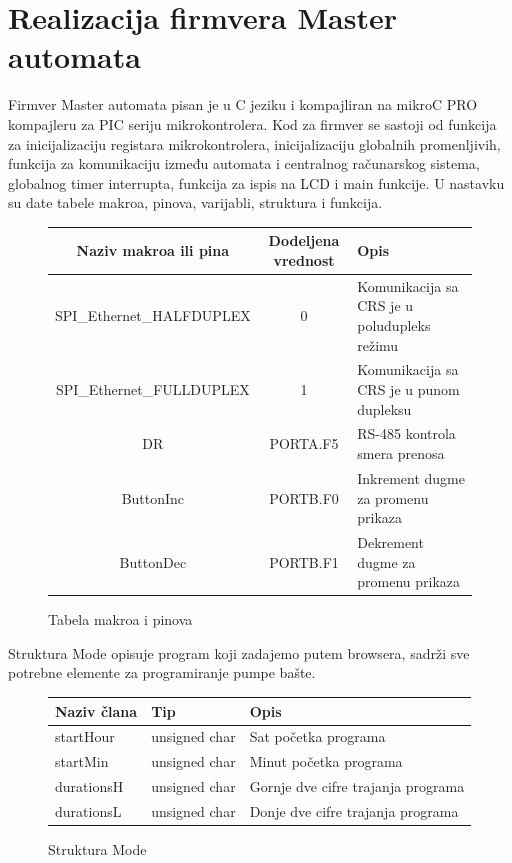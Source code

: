 \documentclass[12pt]{article}
\numberwithin{figure}{section}
\begin{document}
\section{Realizacija firmvera Master automata}
  Firmver Master automata pisan je u C jeziku i kompajliran na mikroC PRO kompajleru za PIC seriju mikrokontrolera.
  Kod za firmver se sastoji od funkcija za inicijalizaciju registara mikrokontrolera, inicijalizaciju globalnih promenljivih, funkcija za komunikaciju između automata i centralnog računarskog sistema, globalnog timer interrupta, funkcija za ispis na LCD i main funkcije.\newline
  U nastavku su date tabele makroa, pinova, varijabli, struktura i funkcija.
  \begin{figure}[ht]
    \caption{Tabela makroa i pinova}
    \begin{tabular}{|c|c|p{5.5cm}|}
      \hline
      Naziv makroa ili pina & Dodeljena vrednost & Opis \\
      \hline
      SPI\_Ethernet\_HALFDUPLEX & 0 & Komunikacija sa CRS je u poludupleks režimu\\
      \hline
      SPI\_Ethernet\_FULLDUPLEX & 1 & Komunikacija sa CRS je u punom dupleksu\\
      \hline
      DR & PORTA.F5 & RS-485 kontrola smera prenosa\\
      \hline
      ButtonInc & PORTB.F0 & Inkrement dugme za promenu prikaza\\
      \hline
      ButtonDec & PORTB.F1 &  Dekrement dugme za promenu prikaza\\
      \hline
    \end{tabular}
\end{figure}
\newline
Struktura Mode opisuje program koji zadajemo putem browsera, sadrži sve potrebne elemente za programiranje pumpe bašte.

\begin{figure}[ht]
  \caption{Struktura Mode}
  \begin{tabular}{|p{5cm}|p{5cm}|p{5cm}|}
    \hline
    Naziv člana & Tip & Opis \\ 
    \hline
    startHour & unsigned char & Sat početka programa \\
    \hline 
    startMin & unsigned char & Minut početka programa \\
    \hline 
    durationsH & unsigned char & Gornje dve cifre trajanja programa \\
    \hline
    durationsL & unsigned char & Donje dve cifre trajanja programa \\
    \hline
  \end{tabular}
\end{figure}
\end{document}
